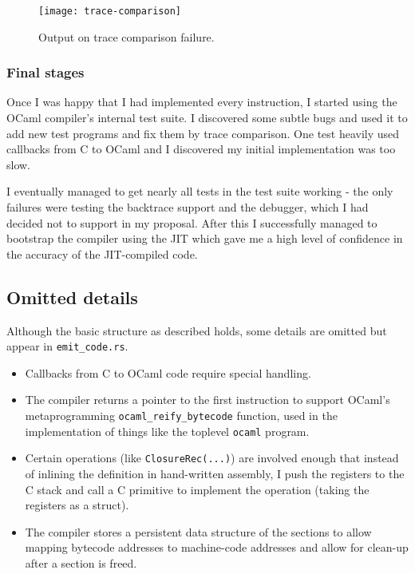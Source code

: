 \begin{figure}[h]
      \texttt{[image: trace-comparison]}
      \caption{Output on trace comparison failure.}
      \label{fig:trace-comparison}
\end{figure}

\subsubsection{Final stages}

Once I was happy that I had implemented every instruction, I started using
the OCaml compiler's internal test suite. I discovered some subtle bugs and used it to add new test
programs and fix them by trace comparison. One test heavily used callbacks from C to OCaml and I
discovered my initial implementation was too slow.

I eventually managed to get nearly all tests in the test suite working - the only failures were
testing the backtrace support and the debugger, which I had decided not to support in my proposal.
After this I successfully managed to bootstrap the compiler using the JIT which gave me a high
level of confidence in the accuracy of the JIT-compiled code.

\subsection{Omitted details}

Although the basic structure as described holds, some details are omitted but appear in
\texttt{emit\_code.rs}.

\begin{itemize}
      \item Callbacks from C to OCaml code require special handling.
      \item The compiler returns a pointer to the first instruction to support OCaml's
            metaprogramming \texttt{ocaml\_reify\_bytecode} function, used in the implementation of
            things like the
            toplevel \texttt{ocaml} program.
      \item Certain operations (like \texttt{ClosureRec(...)}) are involved enough that instead of
            inlining the definition in
            hand-written assembly, I push the registers to the C stack and call a C primitive to
            implement the
            operation (taking the registers as a struct).
      \item The compiler stores a persistent data structure of the sections to allow mapping
            bytecode addresses to machine-code addresses and allow for clean-up after a section is
            freed.
\end{itemize}

